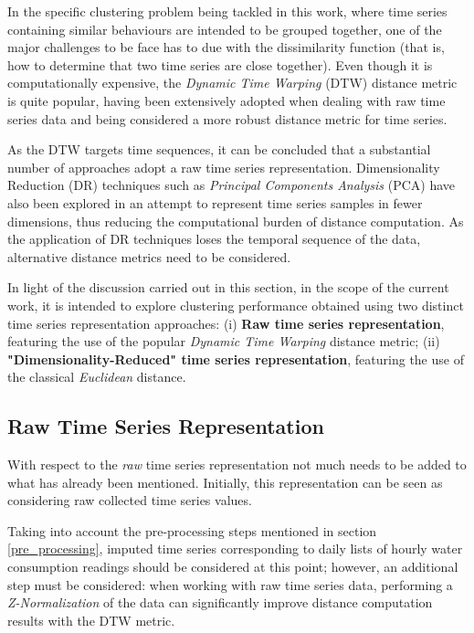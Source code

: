 \documentclass[9pt,journal,compsoc]{IEEEtran}
\begin{document}
In the specific clustering problem being tackled in this work, where time series containing similar behaviours are intended to be grouped together, one of the major challenges to be face has to due with the dissimilarity function (that is, how to determine that two time series are close together). Even though it is computationally expensive, the \emph{Dynamic Time Warping} (DTW)\cite{chu2002iterative} distance metric is quite popular, having been extensively adopted when dealing with raw time series data\cite{liao2005clustering, petitjean2014dynamic, izakian2015fuzzy, aghabozorgi2015time} and being considered a more robust distance metric for time series\cite{wang2013experimental}. 

As the DTW targets time sequences, it can be concluded that a substantial number of approaches adopt a raw time series representation. Dimensionality Reduction (DR) techniques such as \emph{Principal Components Analysis} (PCA) have also been explored \cite{abreu2012using} in an attempt to represent time series samples in fewer dimensions, thus reducing the computational burden of distance computation. As the application of DR techniques loses the temporal sequence of the data, alternative distance metrics need to be considered.

In light of the discussion carried out in this section, in the scope of the current work, it is intended to explore clustering performance obtained using two distinct time series representation approaches: (i) \textbf{Raw time series representation}, featuring the use of the popular \emph{Dynamic Time Warping} distance metric; (ii) \textbf{"Dimensionality-Reduced" time series representation}, featuring the use of the classical \emph{Euclidean} distance.

\subsection{Raw Time Series Representation}

With respect to the \emph{raw} time series representation not much needs to be added to what has already been mentioned. Initially, this representation can be seen as considering raw collected time series values.

Taking into account the pre-processing steps mentioned in section \ref{pre_processing}, imputed time series corresponding to daily lists of hourly water consumption readings should be considered at this point; however, an additional step must be considered: when working with raw time series data, performing a \emph{Z-Normalization} of the data can significantly improve distance computation results with the DTW metric\cite{mueen2016extracting}.
\end{document}
